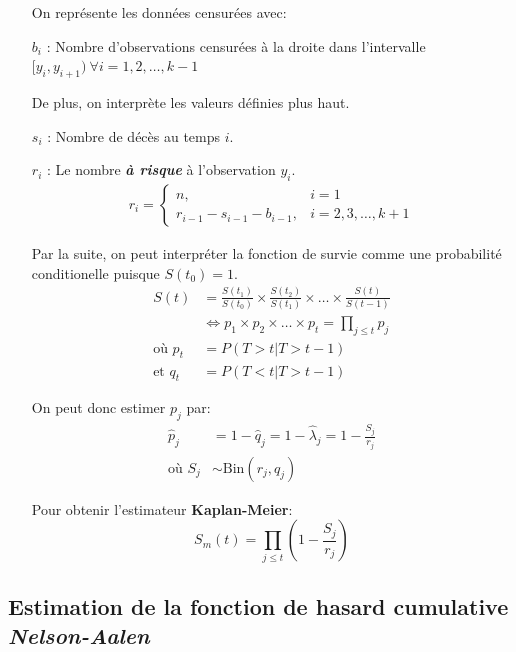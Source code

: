 \documentclass[french, landscape]{article}
\begin{document}
\begin{multicols*}{3}
\begin{enumerate}
	\item [] On représente les données censurées avec:
	\item[$b_{i}$ : ] Nombre d'observations censurées à la droite dans l'intervalle $[y_{i}, y_{i + 1}) \ \forall i = 1, 2, \dots, k - 1$
	\item[] De plus, on interprète les valeurs définies plus haut.
	\item[$s_i$ : ] Nombre de décès au temps $i$.
	\item[$r_i$ : ] Le nombre \textit{\textbf{à risque}} à l'observation $y_{i}$.
\begin{align*}
	r_{i} = 
		\begin{cases}
			n, & i = 1 \\
			r_{i - 1} - s_{i - 1} - b_{i - 1}, & i = 2, 3, \dots, k + 1
		\end{cases}
\end{align*}
\item[] Par la suite, on peut interpréter la fonction de survie comme une probabilité conditionelle puisque $S(t_0) = 1$.
\begin{align*}
	S(t) &= \frac{S(t_1)}{S(t_0)} \times \frac{S(t_2)}{S(t_1)} \times \dots \times \frac{S(t)}{S(t-1)} \\
	&\Leftrightarrow p_{1} \times p_{2} \times \dots \times p_{t} = \prod_{j \le t} p_{j} \\
	\text{où } p_{t} &= P(T > t | T > t - 1) \\
	\text{et } q_{t} &= P(T < t | T > t - 1)
\end{align*}
	\item[] On peut donc estimer $p_{j}$ par:
\begin{align*}
		\hat{p}_{j} &= 1 - \hat{q}_{j} = 1 - \hat{\lambda}_{j} = 1 - \frac{S_{j}}{r_{j}} \\
		\text{où } S_j &\sim \text{Bin}(r_j, q_j) 
\end{align*}
	\item[] Pour obtenir l'estimateur \textbf{Kaplan-Meier}:
	\[
	S_{m}(t) = \prod\limits_{j \le t} \left( 1 - \frac{S_j}{r_j} \right)
	\]		
\end{enumerate}

\subsection*{Estimation de la fonction de hasard cumulative \textbf{\textit{Nelson-Aalen}}}


\end{multicols*}
\end{document}

